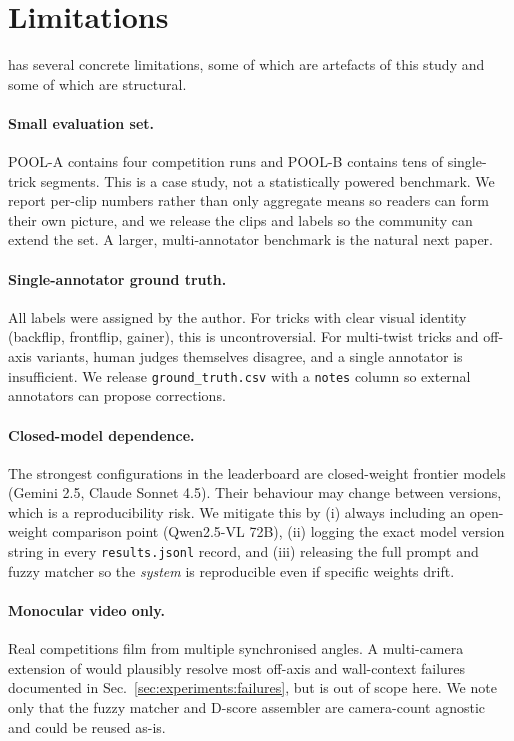 \section{Limitations}
\label{sec:limitations}

\sys{} has several concrete limitations, some of which are artefacts of
this study and some of which are structural.

\paragraph{Small evaluation set.}
POOL-A contains four competition runs and POOL-B contains tens of
single-trick segments. This is a case study, not a statistically powered
benchmark. We report per-clip numbers rather than only aggregate means so
readers can form their own picture, and we release the clips and labels
so the community can extend the set. A larger, multi-annotator benchmark
is the natural next paper.

\paragraph{Single-annotator ground truth.}
All labels were assigned by the author. For tricks with clear visual
identity (backflip, frontflip, gainer), this is uncontroversial. For
multi-twist tricks and off-axis variants, human judges themselves
disagree, and a single annotator is insufficient. We release
\texttt{ground\_truth.csv} with a \texttt{notes} column so external
annotators can propose corrections.

\paragraph{Closed-model dependence.}
The strongest configurations in the leaderboard are closed-weight
frontier models (Gemini 2.5, Claude Sonnet 4.5). Their behaviour may
change between versions, which is a reproducibility risk. We mitigate
this by (i) always including an open-weight comparison point
(Qwen2.5-VL 72B), (ii) logging the exact model version string in every
\texttt{results.jsonl} record, and (iii) releasing the full prompt and
fuzzy matcher so the \emph{system} is reproducible even if specific
weights drift.

\paragraph{Monocular video only.}
Real competitions film from multiple synchronised angles. A
multi-camera extension of \sys{} would plausibly resolve most
off-axis and wall-context failures documented in
Sec.~\ref{sec:experiments:failures}, but is out of scope here. We
note only that the fuzzy matcher and D-score assembler are camera-count
agnostic and could be reused as-is.


